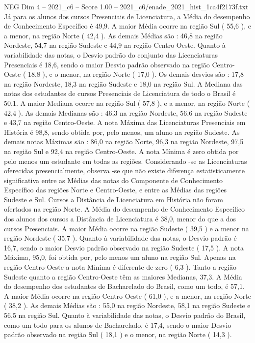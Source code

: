 \begin{textsample}{NEG Dim 4 – 2021\_c6 – Score 1.00 – 2021\_c6/enade\_2021\_hist\_1ca4f2173f.txt}
Já para os alunos dos cursos Presenciais de Licenciatura, a Média do desempenho de Conhecimento Específico é 49,9.
A maior Média ocorre na região Sul ( 55,6 ), e a menor, na região Norte ( 42,4 ).
As demais Médias são : 46,8 na região Nordeste, 54,7 na região Sudeste e 44,9 na região Centro-Oeste.
Quanto à variabilidade das notas, o Desvio padrão do conjunto das Licenciaturas Presenciais é 18,6, sendo o maior Desvio padrão observado na região Centro-Oeste ( 18,8 ), e o menor, na região Norte ( 17,0 ).
Os demais desvios são : 17,8 na região Nordeste, 18,3 na região Sudeste e 18,0 na região Sul.
A Mediana das notas dos estudantes de cursos Presenciais de Licenciatura de todo o Brasil é 50,1.
A maior Mediana ocorre na região Sul ( 57,8 ), e a menor, na região Norte ( 42,4 ).
As demais Medianas são : 46,3 na região Nordeste, 56,6 na região Sudeste e 43,7 na região Centro-Oeste.
A nota Máxima das Licenciaturas Presenciais em História é 98,8, sendo obtida por, pelo menos, um aluno na região Sudeste.
As demais notas Máximas são : 86,0 na região Norte, 96,3 na região Nordeste, 97,5 na região Sul e 92,4 na região Centro-Oeste.
A nota Mínima é zero obtida por pelo menos um estudante em todas as regiões.
Considerando -se as Licenciaturas oferecidas presencialmente, observa -se que não existe diferença estatisticamente significativa entre as Médias das notas do Componente de Conhecimento Específico das regiões Norte e Centro-Oeste, e entre as Médias das regiões Sudeste e Sul.
Cursos a Distância de Licenciatura em História não foram ofertados na região Norte.
A Média do desempenho de Conhecimento Específico dos alunos dos cursos a Distância de Licenciatura é 38,0, menor do que a dos cursos Presenciais.
A maior Média ocorre na região Sudeste ( 39,5 ) e a menor na região Nordeste ( 35,7 ).
Quanto à variabilidade das notas, o Desvio padrão é 16,7, sendo o maior Desvio padrão observado na região Sudeste ( 17,5 ).
A nota Máxima, 95,0, foi obtida por, pelo menos um aluno na região Sul.
Apenas na região Centro-Oeste a nota Mínima é diferente de zero ( 6,3 ).
Tanto a região Sudeste quanto a região Centro-Oeste têm as maiores Medianas, 37,3.
A Média do desempenho dos estudantes de Bacharelado do Brasil, como um todo, é 57,1.
A maior Média ocorre na região Centro-Oeste ( 61,0 ), e a menor, na região Norte ( 38,2 ).
As demais Médias são : 55,0 na região Nordeste, 58,1 na região Sudeste e 56,5 na região Sul.
Quanto à variabilidade das notas, o Desvio padrão do Brasil, como um todo para os alunos de Bacharelado, é 17,4, sendo o maior Desvio padrão observado na região Sul ( 18,1 ) e o menor, na região Norte ( 14,3 ).

\end{textsample}

